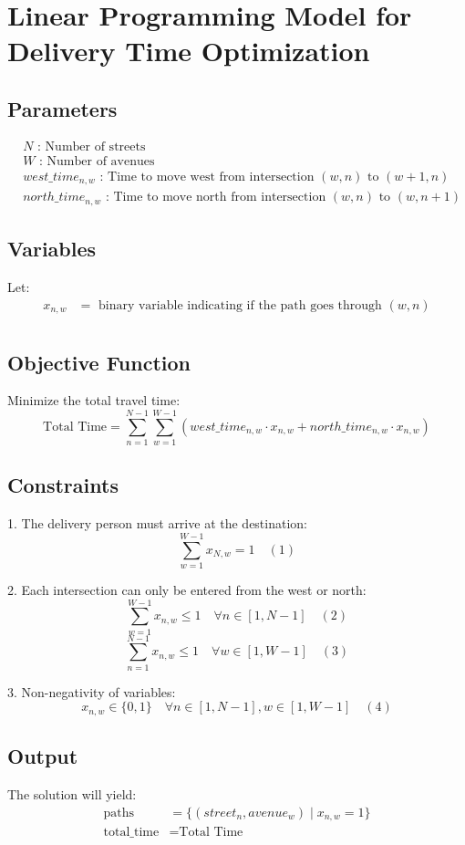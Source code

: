\documentclass{article}
\begin{document}
\section*{Linear Programming Model for Delivery Time Optimization}

\subsection*{Parameters}
\begin{align*}
& N \text{ : Number of streets} \\
& W \text{ : Number of avenues} \\
& west\_time_{n,w} \text{ : Time to move west from intersection } (w,n) \text{ to }(w+1,n) \\
& north\_time_{n,w} \text{ : Time to move north from intersection } (w,n) \text{ to }(w,n+1)
\end{align*}

\subsection*{Variables}
Let:
\begin{align*}
x_{n,w} & = \text{ binary variable indicating if the path goes through } (w,n) \\
\end{align*}

\subsection*{Objective Function}
Minimize the total travel time:
\[
\text{Total Time} = \sum_{n=1}^{N-1} \sum_{w=1}^{W-1} (west\_time_{n,w} \cdot x_{n,w} + north\_time_{n,w} \cdot x_{n,w})
\]

\subsection*{Constraints}
1. The delivery person must arrive at the destination:
\[
\sum_{w=1}^{W-1} x_{N,w} = 1 \quad (1)
\]

2. Each intersection can only be entered from the west or north:
\[
\sum_{w=1}^{W-1} x_{n,w} \leq 1 \quad \forall n \in [1, N-1] \quad (2) 
\]
\[
\sum_{n=1}^{N-1} x_{n,w} \leq 1 \quad \forall w \in [1, W-1] \quad (3)
\]

3. Non-negativity of variables:
\[
x_{n,w} \in \{0, 1\} \quad \forall n \in [1, N-1], w \in [1, W-1] \quad (4)
\]

\subsection*{Output}
The solution will yield:
\begin{align*}
\text{paths} & = \{(street_{n}, avenue_{w}) \mid x_{n,w} = 1\} \\
\text{total\_time} & = \text{Total Time}
\end{align*}
\end{document}

